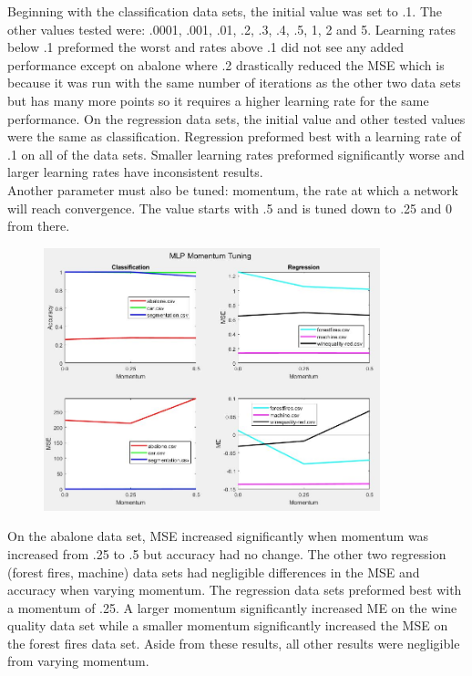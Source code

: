 \documentclass[twoside,11pt]{article}
\begin{document}
Beginning with the classification data sets, the initial value was set to .1. The other values tested were: .0001, .001, .01, .2, .3, .4, .5, 1, 2 and 5. Learning rates below .1 preformed the worst and rates above .1 did not see any added performance except on abalone where .2 drastically reduced the MSE which is because it was run with the same number of iterations as the other two data sets but has many more points so it requires a higher learning rate for the same performance.
On the regression data sets, the initial value and other tested values were the same as classification. Regression preformed best with a learning rate of .1 on all of the data sets. Smaller learning rates preformed significantly worse and larger learning rates have inconsistent results. \\
Another parameter must also be tuned: momentum, the rate at which a network will reach convergence. The value starts with .5 and is tuned down to .25 and 0 from there. \\
\begin{figure}[h]
	\centering
	\includegraphics[height=3in]{FINAL_FIGS/MLP_MOMENTUM.JPG}
\end{figure}
On the abalone data set, MSE increased significantly when momentum was increased from .25 to .5 but accuracy had no change. The other two regression (forest fires, machine) data sets had negligible differences in the MSE and accuracy when varying momentum. The regression data sets preformed best with a momentum of .25. A larger momentum significantly increased ME on the wine quality data set while a smaller momentum significantly increased the MSE on the forest fires data set. Aside from these results, all other results were negligible from varying momentum.
\end{document}
